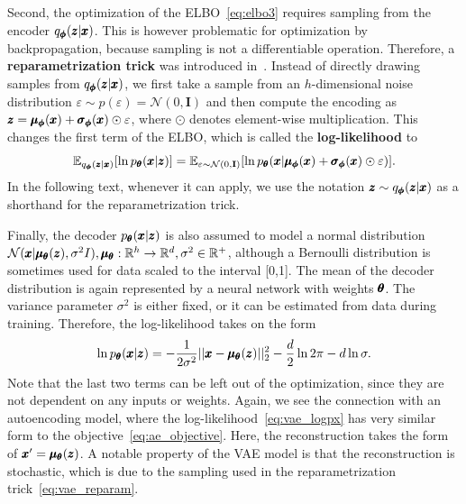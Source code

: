 Second, the optimization of the ELBO~\eqref{eq:elbo3} requires sampling from the encoder $q_{\pmb{{\phi}}}(\pmb{{z}}|\pmb{{x}})$. This is however problematic for optimization by backpropagation, because sampling is not a differentiable operation. Therefore, a \textbf{reparametrization trick} was introduced in~\cite{kingma2013vae}. Instead of directly drawing samples from $q_{\pmb{{\phi}}}(\pmb{{z}}|\pmb{{x}})$, we first take a sample from an $h$-dimensional noise distribution $\varepsilon\sim p(\varepsilon)=\mathcal{N}(0,\mathbf{I})$ and then compute the encoding as $\pmb{{z}}=\pmb{{\mu}}_{\pmb{{\phi}}}(\pmb{{x}})+\pmb{{\sigma}}_{\pmb{{\phi}}}(\pmb{{x}}) \odot \varepsilon$, where $\odot$ denotes element-wise multiplication. This changes the first term of the ELBO, which is called the \textbf{log-likelihood} to
\begin{equation} \label{eq:vae_reparam}
\mathbb{E}_{q_{\vc{\phi}}(\vc{z}|\vc{x})}\left[\ln p_{\vc{\theta}}(\vc{x}|\vc{z})\right] = \mathbb{E}_{\varepsilon\sim\mathcal{N}(0,\textbf{I})}\left[\ln p_{\vc{\theta}}(\vc{x}| \vc{\mu}_{\vc{\phi}}(\vc{x})+\vc{\sigma}_{\vc{\phi}}(\vc{x}) \odot \varepsilon )\right].
\end{equation}
In the following text, whenever it can apply, we use the notation $\pmb{{z}} \sim q_{\pmb{{\phi}}}(\pmb{{z}}|\pmb{{x}})$ as a shorthand for the reparametrization trick.

Finally, the decoder $p_{\pmb{{\theta}}}(\pmb{{x}}|\pmb{{z}})$ is also assumed to model a normal distribution\\ $\mathcal{N}(\pmb{{x}}|\pmb{{\mu}}_{\pmb{{\theta}}}(\pmb{{z}}),\sigma^2 I), \pmb{{\mu}}_{\pmb{{\theta}}} :\mathbb{R}^h \rightarrow \mathbb{R}^d, \sigma^2\in\mathbb{R}^+$, although a Bernoulli distribution is sometimes used for data scaled to the interval [0,1]. The mean of the decoder distribution is again represented by a neural network with weights $\pmb{{\theta}}$. The variance parameter $\sigma^2$ is either fixed, or it can be estimated from data during training. Therefore, the log-likelihood takes on the form 
\begin{equation} \label{eq:vae_logpx}
\ln p_{\pmb{{\theta}}}(\pmb{{x}}|\pmb{{z}}) = - \frac{1}{2\sigma^2} \vert \vert \pmb{{x}} - \pmb{{\mu}}_{\pmb{{\theta}}}(\pmb{{z}}) \vert \vert_2^2 - \frac{d}{2} \ln 2\pi - d \ln \sigma. 
\end{equation}
Note that the last two terms can be left out of the optimization, since they are not dependent on any inputs or weights. Again, we see the connection with an autoencoding model, where the log-likelihood~\eqref{eq:vae_logpx} has very similar form to the objective~\eqref{eq:ae_objective}. Here, the reconstruction takes the form of $\pmb{{x}}' = \pmb{{\mu}}_{\pmb{{\theta}}}(\pmb{{z}})$. A notable property of the VAE model is that the reconstruction is stochastic, which is due to the sampling used in the reparametrization trick~\eqref{eq:vae_reparam}. 

